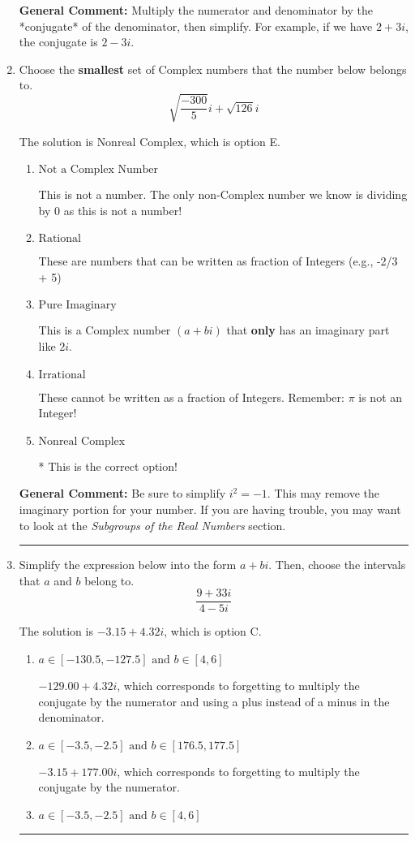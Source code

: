 \documentclass{extbook}[14pt]
\newcommand{\litem}[1]{\item #1

\rule{\textwidth}{0.4pt}}
\begin{document}
\begin{enumerate}
{\textbf{General Comment:} Multiply the numerator and denominator by the *conjugate* of the denominator, then simplify. For example, if we have $2+3i$, the conjugate is $2-3i$.
}
\litem{
Choose the \textbf{smallest} set of Complex numbers that the number below belongs to.
\[ \sqrt{\frac{-300}{5}} i+\sqrt{126}i \]

The solution is \( \text{Nonreal Complex} \), which is option E.\begin{enumerate}[label=\Alph*.]
\item \( \text{Not a Complex Number} \)

This is not a number. The only non-Complex number we know is dividing by 0 as this is not a number!
\item \( \text{Rational} \)

These are numbers that can be written as fraction of Integers (e.g., -2/3 + 5)
\item \( \text{Pure Imaginary} \)

This is a Complex number $(a+bi)$ that \textbf{only} has an imaginary part like $2i$.
\item \( \text{Irrational} \)

These cannot be written as a fraction of Integers. Remember: $\pi$ is not an Integer!
\item \( \text{Nonreal Complex} \)

* This is the correct option!
\end{enumerate}

\textbf{General Comment:} Be sure to simplify $i^2 = -1$. This may remove the imaginary portion for your number. If you are having trouble, you may want to look at the \textit{Subgroups of the Real Numbers} section.
}
\litem{
Simplify the expression below into the form $a+bi$. Then, choose the intervals that $a$ and $b$ belong to.
\[ \frac{9 + 33 i}{4 - 5 i} \]

The solution is \( -3.15  + 4.32 i \), which is option C.\begin{enumerate}[label=\Alph*.]
\item \( a \in [-130.5, -127.5] \text{ and } b \in [4, 6] \)

 $-129.00  + 4.32 i$, which corresponds to forgetting to multiply the conjugate by the numerator and using a plus instead of a minus in the denominator.
\item \( a \in [-3.5, -2.5] \text{ and } b \in [176.5, 177.5] \)

 $-3.15  + 177.00 i$, which corresponds to forgetting to multiply the conjugate by the numerator.
\item \( a \in [-3.5, -2.5] \text{ and } b \in [4, 6] \)


\end{enumerate}}
\end{enumerate}
\end{document}
